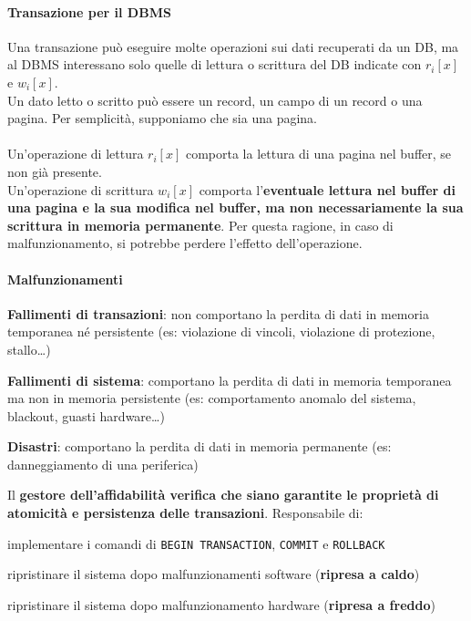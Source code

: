\documentclass[10pt]{book}
\begin{document}
\paragraph{Transazione per il DBMS} Una transazione può eseguire molte operazioni sui dati recuperati da un DB, ma al DBMS interessano solo quelle di lettura o scrittura del DB indicate con $r_i[x]$ e $w_i[x]$.\\
Un dato letto o scritto può essere un record, un campo di un record o una pagina. Per semplicità, supponiamo che sia una pagina.\\\\
Un'operazione di lettura $r_i[x]$ comporta la lettura di una pagina nel buffer, se non già presente.\\
Un'operazione di scrittura $w_i[x]$ comporta l'\textbf{eventuale lettura nel buffer di una pagina e la sua modifica nel buffer, ma non necessariamente la sua scrittura in memoria permanente}. Per questa ragione, in caso di malfunzionamento, si potrebbe perdere l'effetto dell'operazione.
\paragraph{Malfunzionamenti}
\begin{list}{}{}
	\item \textbf{Fallimenti di transazioni}: non comportano la perdita di dati in memoria temporanea né persistente (es: violazione di vincoli, violazione di protezione, stallo\ldots)
	\item \textbf{Fallimenti di sistema}: comportano la perdita di dati in memoria temporanea ma non in memoria persistente (es: comportamento anomalo del sistema, blackout, guasti hardware\ldots)
	\item \textbf{Disastri}: comportano la perdita di dati in memoria permanente (es: danneggiamento di una periferica)
\end{list}
Il \textbf{gestore dell'affidabilità verifica che siano garantite le proprietà di atomicità e persistenza delle transazioni}. Responsabile di:\begin{list}{}{}
	\item implementare i comandi di \texttt{BEGIN TRANSACTION}, \texttt{COMMIT} e \texttt{ROLLBACK}
	\item ripristinare il sistema dopo malfunzionamenti software (\textbf{ripresa a caldo})
	\item ripristinare il sistema dopo malfunzionamento hardware (\textbf{ripresa a freddo})
\end{list}
\end{document}
